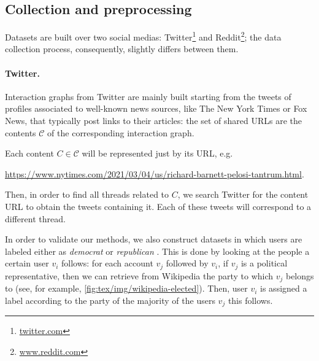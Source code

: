 \subsection{Collection and preprocessing}%
\label{sub:collection_and_preprocessing}

Datasets are built over two social medias:
Twitter\footnote{\url{twitter.com}} and Reddit\footnote{\url{www.reddit.com}}; the data
collection process, consequently, slightly differs between them.

\paragraph{Twitter.}%
\label{par:twitter-data}

Interaction graphs from Twitter are mainly built starting from the tweets
of profiles associated to well-known news sources, like The
New York Times or Fox News, that typically post links to their articles:
the set of shared URLs are the contents $\mathcal{C} $ of the corresponding interaction graph.


Each content $C \in \mathcal{C}$ will be represented just by its URL,
e.g.

	{\footnotesize
		\begin{center}
			\url{https://www.nytimes.com/2021/03/04/us/richard-barnett-pelosi-tantrum.html}.
		\end{center}
	}

Then, in order to find all threads related to $C$, we search Twitter for
the content URL to obtain the tweets containing it. Each of these tweets
will correspond to a different thread.

\medskip

In order to validate our methods, we also construct datasets in which users are labeled either as
\emph{democrat} or \emph{republican} \footnotemark. This is done by looking at the people a
certain user $v_i$ follows: for each account $v_j$ followed by $v_i$, if $v_j$ is a political representative, then we can
retrieve from Wikipedia the party to which $v_j$ belongs to (see, for
example, \autoref{fig:tex/img/wikipedia-elected}). Then, user $v_i$ is assigned a
label according to the party of the majority of the users $v_j$ this
follows.

